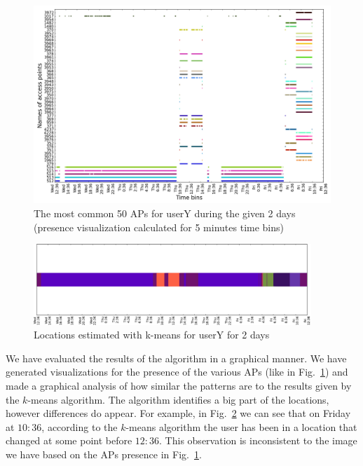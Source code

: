 \begin{figure}[!h]
\centering
\includegraphics[width=\textwidth]{figures/kmeans/user_3_sorted_2days_no_rssi_plot.png}
\caption{The most common 50 APs for userY during the given 2 days (presence
visualization calculated for 5 minutes time bins)}
\label{user_3_days1_2_APs_presence}
\end{figure}

\begin{figure}[!h]
\centering
\includegraphics[width=0.935\textwidth]{figures/kmeans/kmeans_locations_(6)_2days_plot.png}
\caption{Locations estimated with k-means for userY for 2 days}
\label{user_3_days1_2_kmeans}
\end{figure}

We have evaluated the results of the algorithm in a graphical manner. We have
generated visualizations for the presence of the various APs (like in
Fig.~\ref{user_3_days1_2_APs_presence}) and made a graphical analysis of how
similar the patterns are to the results given by the $k$-means algorithm. The
algorithm identifies a big part of the locations, however differences do appear.
For example, in Fig.~\ref{user_3_days1_2_kmeans} we can see that on Friday at
$10:36$, according to the $k$-means algorithm the user has been in a location
that changed at some point before $12:36$. This observation is inconsistent to
the image we have based on the APs presence in
Fig.~\ref{user_3_days1_2_APs_presence}.

